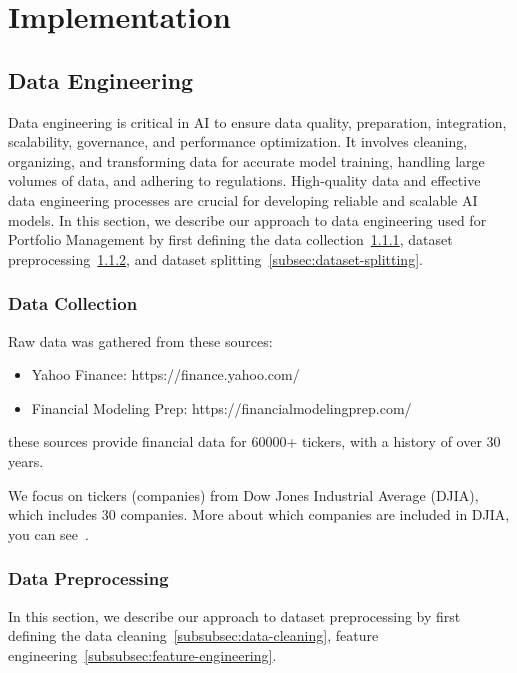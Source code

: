 \documentclass[../xlapes02]{subfiles}
\begin{document}
    \chapter{Implementation}\label{ch:implementation}


    \section{Data Engineering}\label{sec:data-engineering}
    Data engineering is critical in AI to ensure data quality, preparation, integration, scalability, governance, and performance optimization. It involves cleaning, organizing, and transforming data for accurate model training, handling large volumes of data, and adhering to regulations. High-quality data and effective data engineering processes are crucial for developing reliable and scalable AI models. In this section, we describe our approach to data engineering used for Portfolio Management by first defining the data collection~\cref{subsec:data-collection}, dataset preprocessing~\cref{subsec:dataset-preprocessing}, and dataset splitting~\cref{subsec:dataset-splitting}.

    \subsection{Data Collection}\label{subsec:data-collection}
    Raw data was gathered from these sources:
    \begin{itemize}
        \item Yahoo Finance: https://finance.yahoo.com/
        \item Financial Modeling Prep: https://financialmodelingprep.com/
    \end{itemize}
    these sources provide financial data for 60000+ tickers, with a history of over 30 years.

    We focus on tickers (companies) from Dow Jones Industrial Average (DJIA), which includes 30 companies. More about which companies are included in DJIA, you can see~\cite{enwiki:1141766585}.

    \subsection{Data Preprocessing}\label{subsec:dataset-preprocessing}
    In this section, we describe our approach to dataset preprocessing by first defining the data cleaning~\cref{subsubsec:data-cleaning}, feature engineering~\cref{subsubsec:feature-engineering}.
\end{document}
